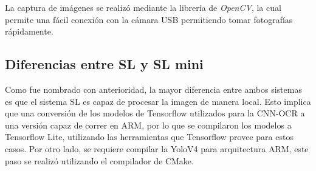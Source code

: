 La captura de imágenes se realizó mediante la librería de \textit{OpenCV}, la cual permite una fácil conexión con la cámara USB permitiendo tomar fotografías rápidamente.

\subsection{Diferencias entre SL y SL mini}

Como fue nombrado con anterioridad, la mayor diferencia entre ambos sistemas es que el sistema SL es capaz de procesar la imagen de manera local. Esto implica que una conversión de los modelos de Tensorflow \cite{google_tensorflow_nodate} utilizados para la CNN-OCR a una versión capaz de correr en ARM, por lo que se compilaron los modelos a Tensorflow Lite, utilizando las herramientas que Tensorflow provee para estos casos. Por otro lado, se requiere compilar la YoloV4 para arquitectura ARM, este paso se realizó utilizando el compilador de CMake.

